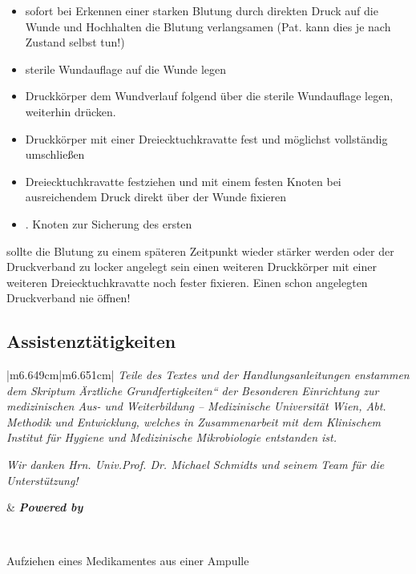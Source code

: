 \documentclass{article}
\begin{document}
\begin{itemize}
\item {\mdseries
sofort bei Erkennen einer starken Blutung durch direkten Druck auf die
Wunde und Hochhalten die Blutung verlangsamen (Pat. kann dies je nach
Zustand selbst tun!)}

\item {\mdseries
sterile Wundauflage auf die Wunde legen}

\item {\mdseries
Druckk\"orper dem Wundverlauf folgend \"uber die sterile Wundauflage
legen, weiterhin dr\"ucken.}

\item {\mdseries
Druckk\"orper mit einer Dreiecktuchkravatte fest und m\"oglichst
vollst\"andig umschlie{\ss}en}

\item {\mdseries
Dreiecktuchkravatte festziehen und mit einem festen Knoten bei
ausreichendem Druck direkt \"uber der Wunde fixieren}

\item {. Knoten zur Sicherung des ersten}

\end{itemize}
{
sollte die Blutung zu einem sp\"ateren Zeitpunkt wieder st\"arker werden
oder der Druckverband zu locker angelegt sein einen weiteren
Druckk\"orper mit einer weiteren Dreiecktuchkravatte noch fester
fixieren. Einen schon angelegten Druckverband nie \"offnen!}

\subsection{Assistenzt\"atigkeiten}
\begin{center}
\tablehead{}\begin{supertabular}{|m{6.649cm}|m{6.651cm}|}
\hline
{\mdseries\itshape Teile des Textes und der Handlungsanleitungen
enstammen dem Skriptum {\quotedblbase}\"Arztliche
Grundfertigkeiten{\textquotedblleft} der  Besonderen Einrichtung zur
medizinischen Aus- und Weiterbildung -- Medizinische Universit\"at
Wien, Abt. Methodik und Entwicklung, welches in Zusammenarbeit  mit dem
Klinischem Institut f\"ur Hygiene und Medizinische Mikrobiologie
entstanden ist. }

{\mdseries\itshape Wir danken Hrn. Univ.Prof. Dr. Michael Schmidts und
seinem Team f\"ur die Unterst\"utzung!}

 &
{\bfseries\itshape Powered by}

{%
 \par}

\\\hline
\end{supertabular}
\end{center}
{\mdseries\color[rgb]{0.0,0.0,0.5019608}
Aufziehen eines Medikamentes aus einer Ampulle}
\end{document}
